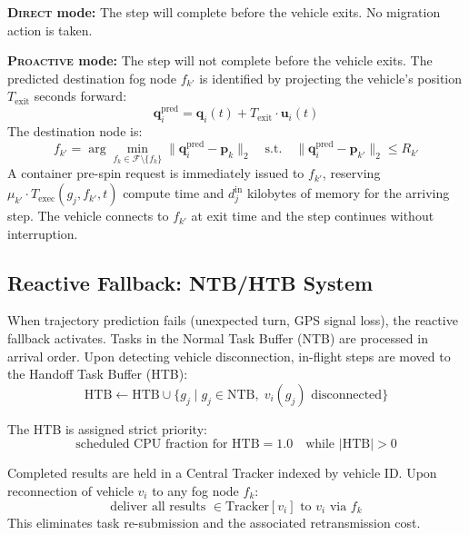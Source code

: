 \documentclass[12pt,a4paper]{article}
\theoremstyle{definition}
\theoremstyle{remark}
\begin{document}
\textbf{\textsc{Direct} mode:} The step will complete before the vehicle exits.
No migration action is taken.

\textbf{\textsc{Proactive} mode:} The step will not complete before the vehicle
exits. The predicted destination fog node $f_{k'}$ is identified by projecting
the vehicle's position $T_{\text{exit}}$ seconds forward:
\begin{equation}
  \bm{q}_i^{\text{pred}} = \bm{q}_i(t) + T_{\text{exit}} \cdot \bm{u}_i(t)
  \label{eq:position_pred}
\end{equation}
The destination node is:
\begin{equation}
  f_{k'} = \arg\min_{f_k \in \mathcal{F} \setminus \{f_k\}}
  \bigl\|\bm{q}_i^{\text{pred}} - \bm{p}_k\bigr\|_2
  \quad \text{s.t.} \quad
  \bigl\|\bm{q}_i^{\text{pred}} - \bm{p}_{k'}\bigr\|_2 \leq R_{k'}
  \label{eq:dest_node}
\end{equation}
A container pre-spin request is immediately issued to $f_{k'}$, reserving
$\mu_{k'} \cdot T_{\text{exec}}(g_j, f_{k'}, t)$ compute time and
$d_j^{\text{in}}$ kilobytes of memory for the arriving step. The vehicle
connects to $f_{k'}$ at exit time and the step continues without interruption.

\subsection{Reactive Fallback: NTB/HTB System}

When trajectory prediction fails (unexpected turn, GPS signal loss), the
reactive fallback activates. Tasks in the Normal Task Buffer (NTB) are
processed in arrival order. Upon detecting vehicle disconnection, in-flight
steps are moved to the Handoff Task Buffer (HTB):
\begin{equation}
  \mathrm{HTB} \leftarrow \mathrm{HTB} \cup \{g_j \mid g_j \in \mathrm{NTB},\;
  v_i(g_j) \text{ disconnected}\}
  \label{eq:htb}
\end{equation}

The HTB is assigned strict priority:
\begin{equation}
  \text{scheduled CPU fraction for HTB} = 1.0
  \quad \text{while } |\mathrm{HTB}| > 0
  \label{eq:htb_priority}
\end{equation}

Completed results are held in a Central Tracker indexed by vehicle ID.
Upon reconnection of vehicle $v_i$ to any fog node $f_k$:
\begin{equation}
  \text{deliver all results } \in \mathrm{Tracker}[v_i]
  \text{ to } v_i \text{ via } f_k
  \label{eq:delivery}
\end{equation}
This eliminates task re-submission and the associated retransmission cost.
\end{document}
